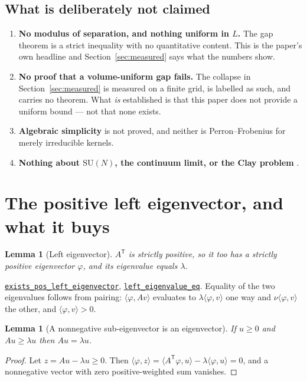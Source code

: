 \documentclass[11pt]{article}
\newtheorem{lemma}[theorem]{Lemma}
\theoremstyle{definition}
\newcommand{\anchor}{ac8979631c1541b059b3c10f590ca174b0b5f6be}
\newcommand{\osline}[3]{%
  \href{https://github.com/lluiseriksson/THE-ERIKSSON-PROGRAMME/blob/\anchor/YangMills/OS/#1.lean\#L#2}{\nolinkurl{#3}}}
\newcommand{\SU}{\mathrm{SU}}
\begin{document}
\subsection{What is deliberately not claimed}

\begin{enumerate}
\item \textbf{No modulus of separation, and nothing uniform in $L$.}  The gap
theorem is a strict inequality with no quantitative content.  This is the
paper's own headline and Section~\ref{sec:measured} says what the numbers show.
\item \textbf{No proof that a volume-uniform gap fails.}  The collapse in
Section~\ref{sec:measured} is measured on a finite grid, is labelled as such,
and carries no theorem.  What \emph{is} established is that this paper does not
provide a uniform bound --- not that none exists.
\item \textbf{Algebraic simplicity} is not proved, and neither is
Perron--Frobenius for merely irreducible kernels.
\item \textbf{Nothing about $\SU(N)$, the continuum limit, or the Clay problem}
\cite{Clay}.
\end{enumerate}

\section{The positive left eigenvector, and what it buys}

\begin{lemma}[Left eigenvector]\label{lem:left}
$A^{\mathsf T}$ is strictly positive, so it too has a strictly positive
eigenvector $\varphi$, and its eigenvalue equals $\lambda$.
\end{lemma}

\osline{PerronGap}{74}{exists\_pos\_left\_eigenvector},
\osline{PerronGap}{82}{left\_eigenvalue\_eq}.  Equality of the two
eigenvalues follows from pairing: $\langle\varphi,Av\rangle$ evaluates to
$\lambda\langle\varphi,v\rangle$ one way and $\nu\langle\varphi,v\rangle$ the
other, and $\langle\varphi,v\rangle>0$.

\begin{lemma}[A nonnegative sub-eigenvector is an eigenvector]\label{lem:sub}
If $u\ge0$ and $Au\ge\lambda u$ then $Au=\lambda u$.
\end{lemma}

\begin{proof}
Let $z=Au-\lambda u\ge0$.  Then $\langle\varphi,z\rangle
=\langle A^{\mathsf T}\varphi,u\rangle-\lambda\langle\varphi,u\rangle=0$, and a
nonnegative vector with zero positive-weighted sum vanishes.
\end{proof}
\end{document}
